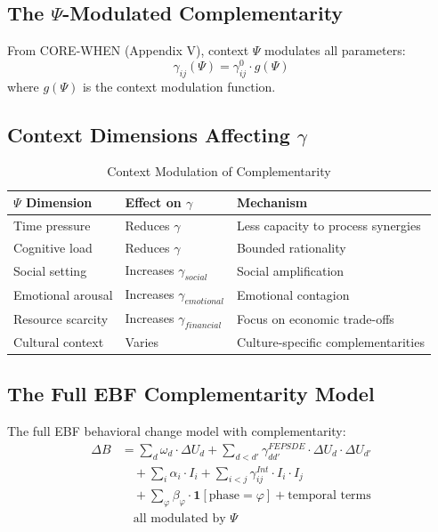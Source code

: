 \subsection{The $\Psi$-Modulated Complementarity}

From CORE-WHEN (Appendix V), context $\Psi$ modulates all parameters:
\begin{equation}
\gamma_{ij}(\Psi) = \gamma^0_{ij} \cdot g(\Psi)
\end{equation}
where $g(\Psi)$ is the context modulation function.

\subsection{Context Dimensions Affecting $\gamma$}

\begin{table}[h]
\centering
\caption{Context Modulation of Complementarity}
\label{tab:context-mod}
\renewcommand{\arraystretch}{1.3}
\small
\begin{tabular}{@{}p{2.5cm}p{4cm}p{5cm}@{}}
\toprule
\textbf{$\Psi$ Dimension} & \textbf{Effect on $\gamma$} & \textbf{Mechanism} \\
\midrule
Time pressure & Reduces $\gamma$ & Less capacity to process synergies \\
Cognitive load & Reduces $\gamma$ & Bounded rationality \\
Social setting & Increases $\gamma_{social}$ & Social amplification \\
Emotional arousal & Increases $\gamma_{emotional}$ & Emotional contagion \\
Resource scarcity & Increases $\gamma_{financial}$ & Focus on economic trade-offs \\
Cultural context & Varies & Culture-specific complementarities \\
\bottomrule
\end{tabular}
\end{table}

\subsection{The Full EBF Complementarity Model}

\begin{theorem}
The full EBF behavioral change model with complementarity:
\begin{align}
\Delta B &= \sum_d \omega_d \cdot \Delta U_d + \sum_{d < d'} \gamma^{FEPSDE}_{dd'} \cdot \Delta U_d \cdot \Delta U_{d'} \nonumber \\
&\quad + \sum_i \alpha_i \cdot I_i + \sum_{i < j} \gamma^{Int}_{ij} \cdot I_i \cdot I_j \nonumber \\
&\quad + \sum_\varphi \beta_\varphi \cdot \mathbf{1}[\text{phase}=\varphi] + \text{temporal terms} \nonumber \\
&\quad \text{all modulated by } \Psi
\end{align}
\end{theorem}

